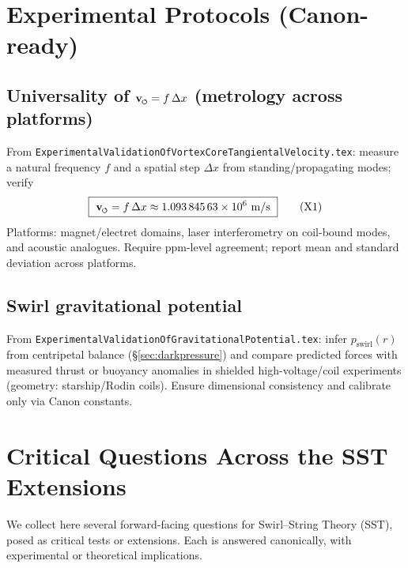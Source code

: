 \documentclass[11pt]{article}
\begin{document}
        \section{Experimental Protocols (Canon-ready)}
        \label{sec:experiments}

        \subsection*{Universality of $\vswirl = f\,\Delta x$ (metrology across platforms)}
            From \texttt{ExperimentalValidationOfVortexCoreTangientalVelocity.tex}: measure a natural frequency $f$ and a spatial step $\Delta x$ from standing/propagating modes; verify
            \begin{equation}
            \boxed{\ \vswirl = f\,\Delta x \approx \num{1.09384563e6}\ \si{m/s}\ } \tag{X1}
            \end{equation}
            Platforms: magnet/electret domains, laser interferometry on coil-bound modes, and acoustic analogues. Require ppm-level agreement; report mean and standard deviation across platforms.

        \subsection*{Swirl gravitational potential}
            From \texttt{ExperimentalValidationOfGravitationalPotential.tex}: infer $p_{\text{swirl}}(r)$ from centripetal balance (\S\ref{sec:darkpressure}) and compare predicted forces with measured thrust or buoyancy anomalies in shielded high-voltage/coil experiments (geometry: starship/Rodin coils). Ensure dimensional consistency and calibrate only via Canon constants.


        \section{Critical Questions Across the SST Extensions}
        \label{sec:critical-questions}

        We collect here several forward-facing questions for Swirl--String Theory (SST), posed as critical tests or extensions. Each is answered canonically, with experimental or theoretical implications.
\end{document}
